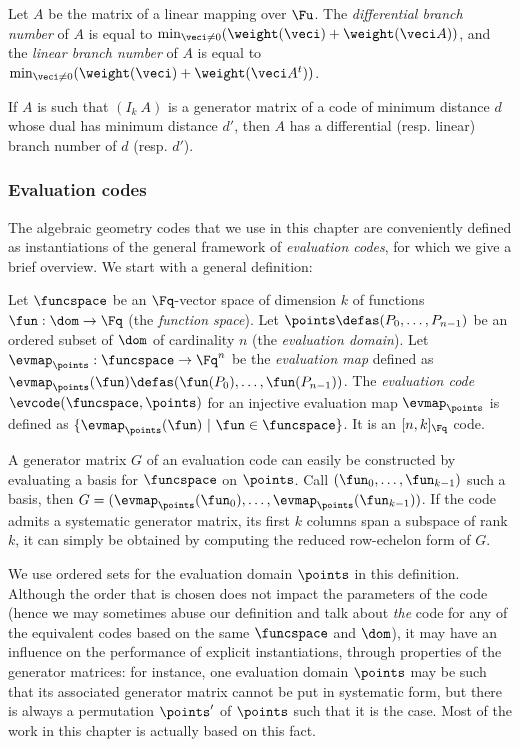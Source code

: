 \begin{defi}
Let $A$ be the matrix of a linear mapping over $\Fu$.
The \emph{differential branch number} of $A$
is equal to $\min_{\veci \neq 0}(\weight(\veci) + \weight(\veci A))$,
and the \emph{linear branch number} of $A$ is equal to $\min_{\veci \neq 0}(\weight(\veci) + \weight(\veci A^t))$.
\end{defi}

If $A$ is such that $(I_k~A)$ is a generator matrix of a code of minimum distance $d$ whose dual has minimum distance $d'$,
then $A$ has a differential (resp. linear) branch number of $d$ (resp. $d'$).

\subsubsection{Evaluation codes}

The algebraic geometry codes that we use in this chapter are conveniently defined as instantiations of the general framework of \emph{evaluation codes}, for which
we give a brief overview.
We start with a general definition:

\begin{defi}
Let $\funcspace$ be an $\Fq$-vector space of dimension $k$ of functions $\fun : \dom \rightarrow \Fq$ (the \emph{function space}). Let $\points \defas (P_0,\ldots, P_{n-1})$
be an ordered subset of $\dom$ of cardinality $n$ (the \emph{evaluation domain}). Let $\evmap_\points : \funcspace \rightarrow \Fq^n$ be the \emph{evaluation map}
defined as $\evmap_\points(\fun) \defas (\fun(P_0),\ldots,\fun(P_{n-1}))$.
The \emph{evaluation code} $\evcode(\funcspace,\points)$ for an injective evaluation map $\evmap_\points$ is defined as $\{\evmap_\points(\fun)~|~\fun \in \funcspace\}$.
It is an $[n,k]_{\Fq}$ code.
\end{defi}

A generator matrix $G$ of an evaluation code can easily be constructed by evaluating a basis for $\funcspace$ on $\points$. Call $(\fun_0,\ldots,\fun_{k-1})$
such a basis, then $G = (\evmap_\points(\fun_0),\ldots,\evmap_\points(\fun_{k-1}))$.
If the code admits a systematic generator matrix, \ie its first $k$ columns span a subspace of rank $k$, it can simply be obtained by computing the reduced row-echelon form of $G$.

We use ordered sets for the evaluation domain $\points$ in this definition. Although the order that is chosen does not impact the parameters of the code (hence we
may sometimes abuse our definition and talk about \emph{the} code for any of the equivalent codes based on the same $\funcspace$ and $\dom$), it may have
an influence on the performance of explicit instantiations, through \eg properties of the generator matrices: for instance, one
evaluation domain $\points$ may be such that its associated generator matrix cannot be put in systematic form, but there is always
a permutation $\points'$ of $\points$ such that it is the case. Most of the work
in this chapter is actually based on this fact.

